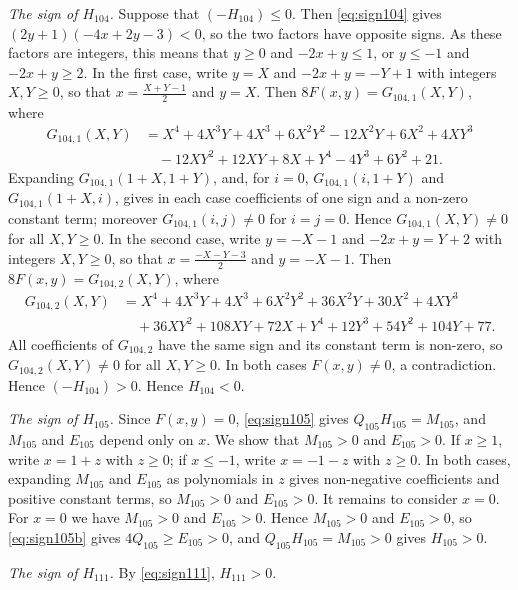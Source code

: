 \documentclass[11pt]{article}
\begin{document}
\emph{The sign of $H_{104}$.} Suppose that $(-H_{104})\leq0$. Then \eqref{eq:sign104} gives $(2y+1)(-4x+2y-3)<0$, so the two factors have opposite signs. As these factors are integers, this means that $y\geq0$ and $-2x+y\leq1$, or $y\leq-1$ and $-2x+y\geq2$. In the first case, write $y=X$ and $-2x+y=-Y+1$ with integers $X,Y\geq0$, so that $x=\tfrac{X+Y-1}{2}$ and $y=X$. Then $8F(x,y)=G_{104,1}(X,Y)$, where
\begin{align*}
G_{104,1}(X,Y)&=X^{4}+4X^{3}Y+4X^{3}+6X^{2}Y^{2}-12X^{2}Y+6X^{2}+4XY^{3}\\
&\quad-12XY^{2}+12XY+8X+Y^{4}-4Y^{3}+6Y^{2}+21.
\end{align*}
Expanding $G_{104,1}(1+X,1+Y)$, and, for $i=0$, $G_{104,1}(i,1+Y)$ and $G_{104,1}(1+X,i)$, gives in each case coefficients of one sign and a non-zero constant term; moreover $G_{104,1}(i,j)\neq0$ for $i=j=0$. Hence $G_{104,1}(X,Y)\neq0$ for all $X,Y\geq0$. In the second case, write $y=-X-1$ and $-2x+y=Y+2$ with integers $X,Y\geq0$, so that $x=\tfrac{-X-Y-3}{2}$ and $y=-X-1$. Then $8F(x,y)=G_{104,2}(X,Y)$, where
\begin{align*}
G_{104,2}(X,Y)&=X^{4}+4X^{3}Y+4X^{3}+6X^{2}Y^{2}+36X^{2}Y+30X^{2}+4XY^{3}\\
&\quad+36XY^{2}+108XY+72X+Y^{4}+12Y^{3}+54Y^{2}+104Y+77.
\end{align*}
All coefficients of $G_{104,2}$ have the same sign and its constant term is non-zero, so $G_{104,2}(X,Y)\neq0$ for all $X,Y\geq0$. In both cases $F(x,y)\neq0$, a contradiction. Hence $(-H_{104})>0$. Hence $H_{104}<0$.

\emph{The sign of $H_{105}$.} Since $F(x,y)=0$, \eqref{eq:sign105} gives $Q_{105}H_{105}=M_{105}$, and $M_{105}$ and $E_{105}$ depend only on $x$. We show that $M_{105}>0$ and $E_{105}>0$. If $x\geq1$, write $x=1+z$ with $z\geq0$; if $x\leq-1$, write $x=-1-z$ with $z\geq0$. In both cases, expanding $M_{105}$ and $E_{105}$ as polynomials in $z$ gives non-negative coefficients and positive constant terms, so $M_{105}>0$ and $E_{105}>0$. It remains to consider $x=0$. For $x=0$ we have $M_{105}>0$ and $E_{105}>0$. Hence $M_{105}>0$ and $E_{105}>0$, so \eqref{eq:sign105b} gives $4Q_{105}\geq E_{105}>0$, and $Q_{105}H_{105}=M_{105}>0$ gives $H_{105}>0$.

\emph{The sign of $H_{111}$.} By \eqref{eq:sign111}, $H_{111}>0$.
\end{document}
